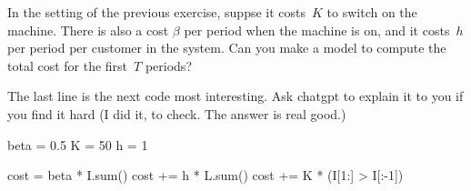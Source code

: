 \documentclass[stochastic-or.tex]{subfiles}
\begin{document}
\begin{exercise}
In the setting of the previous exercise, suppse  it costs~$K$ to switch on the machine.
 There is also a cost $\beta$ per period when the machine is on, and it costs~$h$ per period per customer in the system.
Can you make a  model to compute the total cost for the first~$T$ periods?
\begin{solution}
The last line is the next code most interesting.
Ask chatgpt to explain it to you if you find it hard (I did it, to check.
The answer is real good.)
\begin{python}
beta = 0.5
K = 50
h = 1


cost = beta * I.sum()
cost += h * L.sum()
cost += K * (I[1:] > I[:-1])
\end{python}
\end{solution}
\end{exercise}




\end{document}
